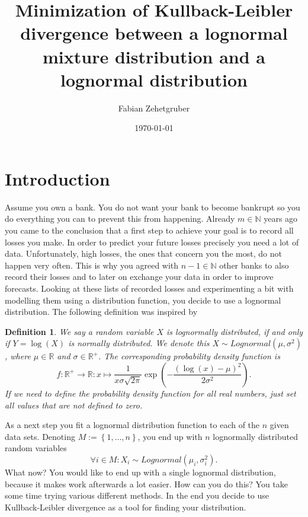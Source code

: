 \documentclass{article}
\title{Minimization of Kullback-Leibler divergence between a lognormal mixture distribution and a lognormal distribution}
\author{Fabian Zehetgruber}
\date{\today}
\newtheorem{definition}{Definition}[section]
\begin{document}
\maketitle

\section{Introduction}
Assume you own a bank. You do not want your bank to become bankrupt so you do everything you can to prevent this from happening. Already $m \in \mathbb{N}$ years ago you came to the conclusion that a first step to achieve your goal is to record all losses you make. In order to predict your future losses precisely you need a lot of data. Unfortunately, high losses, the ones that concern you the most, do not happen very often. This is why you agreed with $n-1 \in \mathbb{N}$ other banks to also record their losses and to later on exchange your data in order to improve forecasts.\newline
Looking at these lists of recorded losses and experimenting a bit with modelling them using a distribution function, you decide to use a lognormal distribution.
The following definition was inspired by \cite{lognormal_distribution}

\begin{definition}
\label{lognormal-dist}
We say a random variable $X$ is lognormally distributed, if and only if $Y = \log(X)$ is normally distributed. \newline
We denote this $X \sim  Lognormal(\mu, \sigma^{2})$, where $\mu \in \mathbb{R}$ and $\sigma \in \mathbb{R}^{+}$. The corresponding probability density function is 
\begin{equation}
    f:\mathbb{R}^{+} \rightarrow \mathbb{R}: x \mapsto \frac {1}{x\sigma \sqrt{2\pi}} \exp \left(-\frac{\left(\log(x)-\mu \right)^{2}}{2\sigma^{2}}\right) \text{.}
\end{equation}{}
If we need to define the probability density function for all real numbers, just set all values that are not defined to zero.
\end{definition}

As a next step you fit a lognormal distribution function to each of the $n$ given data sets. Denoting $M:=\left\{1,\dots,n\right\}$, you end up with $n$ lognormally distributed random variables 
\begin{equation}
    \forall i \in M: X_{i} \sim Lognormal(\mu_{i}, \sigma^{2}_{i})\text{.}
\end{equation}{}
What now? You would like to end up with a single lognormal distribution, because it makes work afterwards a lot easier. How can you do this? You take some time trying various different methods. In the end you decide to use Kullback-Leibler divergence as a tool for finding your distribution.
\end{document}
